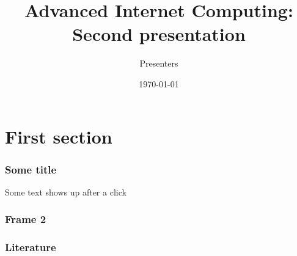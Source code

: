 \documentclass{beamer}
\title{Advanced Internet Computing: Second presentation}
\author{Presenters }
\date{\today}
\begin{document}
\frame{\titlepage}

\section{First section}
\begin{frame}
    \frametitle{Some title}
    Some text
    \pause
    shows up after a click
  \end{frame}
  
\begin{frame}
	\frametitle{Frame 2}
\end{frame}


\begin{frame}[allowframebreaks]
\frametitle<presentation>{Literature}    
 
\end{frame} 	 
\end{document}
